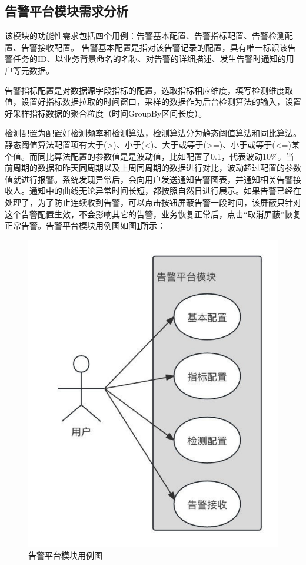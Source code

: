 \subsection{告警平台模块需求分析}
该模块的功能性需求包括四个用例：告警基本配置、告警指标配置、告警检测配置、告警接收配置。
告警基本配置是指对该告警记录的配置，具有唯一标识该告警任务的ID、以业务背景命名的名称、对告警的详细描述、发生告警时通知的用户等元数据。 

告警指标配置是对数据源字段指标的配置，选取指标相应维度，填写检测维度取值，设置好指标数据拉取的时间窗口，采样的数据作为后台检测算法的输入，设置好采样指标数据的聚合粒度（时间GroupBy区间长度）。

检测配置为配置好检测频率和检测算法，检测算法分为静态阈值算法和同比算法。静态阈值算法配置项有大于(>)、小于(<)、大于或等于(>=)、小于或等于(<=)某个值。而同比算法配置的参数值是是波动值，比如配置了0.1，代表波动10$\%$。当前周期的数据和昨天同周期以及上周同周期的数据进行对比，波动超过配置的参数值就进行报警。系统发现异常后，会向用户发送通知告警图表，并通知相关告警接收人。通知中的曲线无论异常时间长短，都按照自然日进行展示。如果告警已经在处理了，为了防止连续收到告警，可以点击按钮屏蔽告警一段时间，该屏蔽只针对这个告警配置生效，不会影响其它的告警，业务恢复正常后，点击“取消屏蔽”恢复正常告警。告警平台模块用例图如图\ref{gaojing}所示：

\begin{figure}[htb]
  \centering
  \includegraphics[width=5in]{figure/chapter3/告警平台模块用例图.pdf}
  \caption{告警平台模块用例图}\label{gaojing}
\end{figure}

